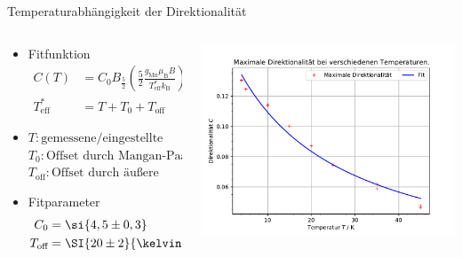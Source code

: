 \begin{frame}{Temperaturabhängigkeit der Direktionalität}
    \begin{columns}
        \begin{column}{0.5\textwidth}
            \begin{itemize}       
                \item <1-> Fitfunktion
                \begin{align*}
                    C(T)&= C_0 B_\text{$\frac{5}{2}$} \left( \frac{5}{2}\frac{g_\text{Mn} \mu_\text{B} B }{T^*_\text{eff} k_\text{B}}\right)\text{,} \\
                    T^*_\text{eff} &= T + T_0 + T_\text{off}
                \end{align*}
                \item <2->  
                    $T: \text{gemessene/eingestellte Temperatur}$
                    $T_0:  \text{Offset durch Mangan-Paare }$
                    $T_\text{off}: \text{Offset durch äußere Einflüsse}$
                \item <3-> Fitparameter
                \begin{align*}
                    C_0 & = \si{4,5 \pm 0,3} \\
                    T_\text{off} & = \SI{ 20 \pm 2}{\kelvin}
                \end{align*}
            \end{itemize}
        \end{column}
        \begin{column}{0.5\textwidth}
            \centering 
             {%
            \includegraphics[scale=0.4]{images/Maximale_Rho_bei_Temperaturabhänigkeit.pdf}\\[-0.5\baselineskip]%
            }%
        \end{column}
    \end{columns}
\end{frame}

